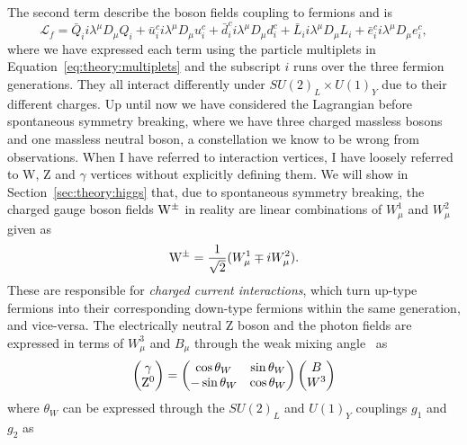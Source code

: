 \par The second term describe the boson fields coupling to fermions and is
\begin{equation}
  \label{eq:theory:gauge}
   \mathcal{L}_{f} = \bar{Q}_ii\lambda^{\mu}D_{\mu} Q_i + \bar{u}_i^ci\lambda^{\mu}D_{\mu} u_i^c
                   + \bar{d}_i^ci\lambda^{\mu}D_{\mu} d_i^c + \bar{L}_ii\lambda^{\mu}D_{\mu} L_i +  
                     \bar{e}_i^ci\lambda^{\mu}D_{\mu} e^c_i,
\end{equation}
where we have expressed each term using the particle multiplets in Equation~\ref{eq:theory:multiplets} and the subscript $i$ runs over the three fermion generations. They all interact differently under $SU(2)_L \times U(1)_Y$ due to their different charges.\newline
Up until now we have considered the Lagrangian before spontaneous symmetry breaking, where we have three charged massless bosons and one massless neutral boson, a constellation we know to be wrong from observations. When I have referred to interaction vertices, I have loosely referred to W, Z and $\gamma$ vertices without explicitly defining them. We will show in Section~\ref{sec:theory:higgs} that, due to spontaneous symmetry breaking, the charged gauge boson fields $\mathrm{W}^{\pm}$ in reality are linear combinations of $W_{\mu}^1$ and $W_{\mu}^2$ given as
\begin{equation}
\mathrm{W}^{\pm} = \frac{1}{\sqrt{2}}(W_{\mu}^1 \mp iW_{\mu}^2).
\end{equation}
These are responsible for \emph{charged current interactions}, which turn up-type fermions into their corresponding down-type fermions within the same generation, and vice-versa. The electrically neutral Z boson and the photon fields are expressed in terms of $W_{\mu}^3$ and $B_{\mu}$ through the weak mixing angle~\cite{Weinberg:1979pi} as
\begin{equation}
\begin{pmatrix} \gamma \\ \mathrm{Z}^0 \end{pmatrix}
  = \begin{pmatrix} \cos \theta_W & \sin \theta_W \\
                   -\sin \theta_W & \cos \theta_W \end{pmatrix}
  \begin{pmatrix} B \\ W^3 \end{pmatrix}                   
\end{equation}
where $\theta_W$ can be expressed through the $SU (2)_L$ and $U(1)_Y$ couplings $g_1$ and $g_2$ as
